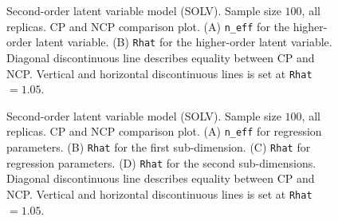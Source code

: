 %
\begin{figure}[h]
	\centering
	\begin{subfigure}
		\texttt{[image: SOLV\_100\_neff6]}
	\end{subfigure}
	\begin{subfigure}
		\texttt{[image: SOLV\_100\_Rhat6]}
	\end{subfigure}
	\caption[Second-order latent variable model (SOLV). Sample size $100$, all replicas. CP and NCP comparison plot.]%
	{Second-order latent variable model (SOLV). Sample size $100$, all replicas. CP and NCP comparison plot. (A) \texttt{n\_eff} for the higher-order latent variable. (B) \texttt{Rhat} for the higher-order latent variable. Diagonal discontinuous line describes equality between CP and NCP. Vertical and horizontal discontinuous lines is set at \texttt{Rhat}$=1.05$. }
	\label{fig:SOLV_stat2}
\end{figure}
%
\begin{figure}[h]
	\centering
	\begin{subfigure}
		\texttt{[image: SOLV\_100\_neff2]}
	\end{subfigure}
	\begin{subfigure}
		\texttt{[image: SOLV\_100\_Rhat2]}
	\end{subfigure}
	\caption[Second-order latent variable model (SOLV). Sample size $100$, all replicas. CP and NCP comparison plot.]%
	{Second-order latent variable model (SOLV). Sample size $100$, all replicas. CP and NCP comparison plot. (A) \texttt{n\_eff} for regression parameters. (B) \texttt{Rhat} for the first sub-dimension. (C) \texttt{Rhat} for regression parameters. (D) \texttt{Rhat} for the second sub-dimensions. Diagonal discontinuous line describes equality between CP and NCP. Vertical and horizontal discontinuous lines is set at \texttt{Rhat}$=1.05$. }
	\label{fig:SOLV_stat3}
\end{figure}